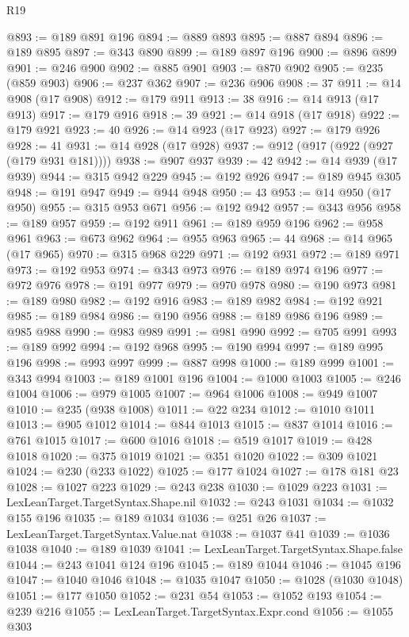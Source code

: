 \begin{lexlean}{R19}
\begin{coremodule}
@893 := @189 @891 @196
@894 := @889 @893
@895 := @887 @894
@896 := @189 @895
@897 := @343 @890
@899 := @189 @897 @196
@900 := @896 @899
@901 := @246 @900
@902 := @885 @901
@903 := @870 @902
@905 := @235 (@859 @903)
@906 := @237 @362
@907 := @236 @906
@908 := 37
@911 := @14 @908 (@17 @908)
@912 := @179 @911
@913 := 38
@916 := @14 @913 (@17 @913)
@917 := @179 @916
@918 := 39
@921 := @14 @918 (@17 @918)
@922 := @179 @921
@923 := 40
@926 := @14 @923 (@17 @923)
@927 := @179 @926
@928 := 41
@931 := @14 @928 (@17 @928)
@937 := @912 (@917 (@922 (@927 (@179 @931 @181))))
@938 := @907 @937
@939 := 42
@942 := @14 @939 (@17 @939)
@944 := @315 @942 @229
@945 := @192 @926
@947 := @189 @945 @305
@948 := @191 @947
@949 := @944 @948
@950 := 43
@953 := @14 @950 (@17 @950)
@955 := @315 @953 @671
@956 := @192 @942
@957 := @343 @956
@958 := @189 @957
@959 := @192 @911
@961 := @189 @959 @196
@962 := @958 @961
@963 := @673 @962
@964 := @955 @963
@965 := 44
@968 := @14 @965 (@17 @965)
@970 := @315 @968 @229
@971 := @192 @931
@972 := @189 @971
@973 := @192 @953
@974 := @343 @973
@976 := @189 @974 @196
@977 := @972 @976
@978 := @191 @977
@979 := @970 @978
@980 := @190 @973
@981 := @189 @980
@982 := @192 @916
@983 := @189 @982
@984 := @192 @921
@985 := @189 @984
@986 := @190 @956
@988 := @189 @986 @196
@989 := @985 @988
@990 := @983 @989
@991 := @981 @990
@992 := @705 @991
@993 := @189 @992
@994 := @192 @968
@995 := @190 @994
@997 := @189 @995 @196
@998 := @993 @997
@999 := @887 @998
@1000 := @189 @999
@1001 := @343 @994
@1003 := @189 @1001 @196
@1004 := @1000 @1003
@1005 := @246 @1004
@1006 := @979 @1005
@1007 := @964 @1006
@1008 := @949 @1007
@1010 := @235 (@938 @1008)
@1011 := @22 @234
@1012 := @1010 @1011
@1013 := @905 @1012
@1014 := @844 @1013
@1015 := @837 @1014
@1016 := @761 @1015
@1017 := @600 @1016
@1018 := @519 @1017
@1019 := @428 @1018
@1020 := @375 @1019
@1021 := @351 @1020
@1022 := @309 @1021
@1024 := @230 (@233 @1022)
@1025 := @177 @1024
@1027 := @178 @181 @23
@1028 := @1027 @223
@1029 := @243 @238
@1030 := @1029 @223
@1031 := LexLeanTarget.TargetSyntax.Shape.nil
@1032 := @243 @1031
@1034 := @1032 @155 @196
@1035 := @189 @1034
@1036 := @251 @26
@1037 := LexLeanTarget.TargetSyntax.Value.nat
@1038 := @1037 @41
@1039 := @1036 @1038
@1040 := @189 @1039
@1041 := LexLeanTarget.TargetSyntax.Shape.false
@1044 := @243 @1041 @124 @196
@1045 := @189 @1044
@1046 := @1045 @196
@1047 := @1040 @1046
@1048 := @1035 @1047
@1050 := @1028 (@1030 @1048)
@1051 := @177 @1050
@1052 := @231 @54
@1053 := @1052 @193
@1054 := @239 @216
@1055 := LexLeanTarget.TargetSyntax.Expr.cond
@1056 := @1055 @303

\end{coremodule}
\end{lexlean}
